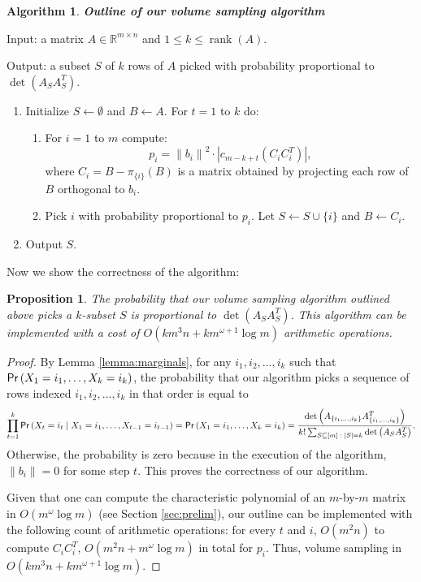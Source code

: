 \documentclass[11pt]{article}
\newcommand{\rank}{\operatorname{rank}}
\newtheorem{prop}[theorem]{Proposition}
\newtheorem{alg}{Algorithm}
\def\reals{\mathbb{R}}
\def\suchthat{\;:\;}
\def\given{\;|\;}
\newcommand{\deter}[1]{\operatorname{det}\left(#1\right)}
\newcommand{\norm}[1]{\left\|#1\right\|}
\newcommand{\prob}[1]{{\sf Pr} \left(#1\right)}
\newcommand{\abs}[1]{\left|#1\right|}
\newcommand{\size}[1]{\left|#1\right|}
\begin{document}
\begin{framed}
\begin{alg}\label{alg:outline}
{\bf Outline of our volume sampling algorithm}
\end{alg}
\noindent Input: a matrix $A \in \reals^{m \times n}$ and $1 \leq k \leq \rank(A)$.

\noindent Output: a subset $S$ of $k$ rows of $A$ picked with probability proportional to $\deter{A_{S}A_{S}^{T}}$.

\begin{enumerate}
\item Initialize $S \leftarrow \emptyset$ and $B \leftarrow A$. For $t=1$ to $k$ do:
\begin{enumerate}
\item For $i=1$ to $m$ compute:
\[
p_{i} = \norm{b_{i}}^{2} \cdot \abs{c_{m-k+t} (C_{i} C_{i}^{T})},
\]
where $C_{i} = B - \pi_{\{i\}}(B)$ is a matrix obtained by projecting each row of $B$ orthogonal to $b_{i}$.
\item Pick $i$ with probability proportional to $p_{i}$. Let $S \leftarrow S \cup \{i\}$ and $B \leftarrow C_{i}$.
\end{enumerate}
\item Output $S$.
\end{enumerate}
\end{framed}

Now we show the correctness of the algorithm:
\begin{prop} \label{prop:outline-correct}
The probability that our volume sampling algorithm outlined above picks a $k$-subset $S$ is proportional to $\deter{A_{S} A_{S}^{T}}$. This algorithm can be implemented with a cost of $O(k m^3 n + km^{\omega+1} \log m)$ arithmetic operations.
\end{prop}
\begin{proof}
By Lemma \ref{lemma:marginals}, for any $i_{1}, i_{2}, \dotsc, i_{k}$ such that $\prob{X_{1} = i_{1}, \dotsc, X_{k} = i_{k}}$, the probability that our algorithm picks a sequence of rows indexed $i_{1}, i_{2}, \dotsc, i_{k}$ in that order is equal to
\[
\prod_{t=1}^{k} \prob{X_{t} = i_{t} \given X_{1} = i_{1}, \dotsc, X_{t-1} = i_{t-1}} = \prob{X_{1} = i_{1}, \dotsc, X_{k} = i_{k}} = \frac{\deter{A_{\{i_{1}, \dotsc, i_{k}\}} A_{\{i_{1}, \dotsc, i_{k}\}}^{T}}}{k! \sum_{S \subseteq [m] \suchthat \size{S}=k} \deter{A_{S} A_{S}^{T}}}.
\]
Otherwise, the probability is zero because in
the execution of the algorithm,
$\norm{b_{i}} = 0$ for some step $t$. This proves the correctness of our algorithm.

Given that one can compute the characteristic polynomial of an $m$-by-$m$ matrix in $O(m^\omega \log m)$ (see Section \ref{sec:prelim}), our outline can be implemented with the following count of arithmetic operations: for every $t$ and $i$, $O(m^2 n)$ to compute $C_i C_i^T$, $O(m^2 n + m^\omega \log m)$ in total for $p_i$. Thus, volume sampling in $O(k m^3 n + km^{\omega +1} \log m)$.
\end{proof}
\end{document}

